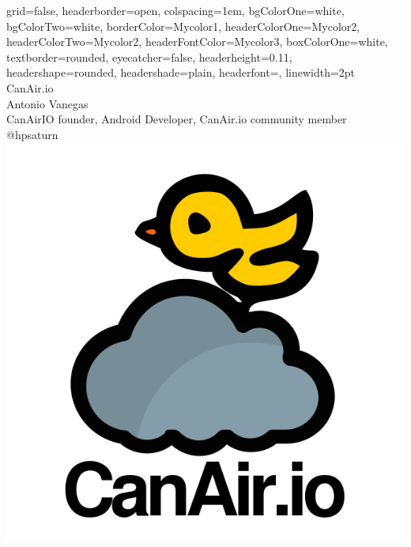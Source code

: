 \documentclass[a0paper,portrait]{baposter}
\begin{document}



\begin{poster}
{
grid=false,
headerborder=open, %
colspacing=1em, %
bgColorOne=white, %
bgColorTwo=white, %
borderColor=Mycolor1, %
headerColorOne=Mycolor2, %
headerColorTwo=Mycolor2, %
headerFontColor=Mycolor3, %
boxColorOne=white, %
textborder=rounded, %
eyecatcher=false, %
headerheight=0.11\textheight, %
headershape=rounded, %
headershade=plain,
headerfont=\Large\textsf, %
linewidth=2pt %
}
{}
%
%
{
\textsf %
{
{CanAir.io}
}
} %
{\sf\vspace{0.2em}\\
Antonio Vanegas  %
\vspace{0.1em}\\
\small{ CanAirIO founder, Android Developer, CanAir.io community member
\vspace{0.2em}\\
@hpsaturn  %
}
}
{\includegraphics[width=.13\linewidth]{images/logo.png}} %



\end{poster}
\end{document}
